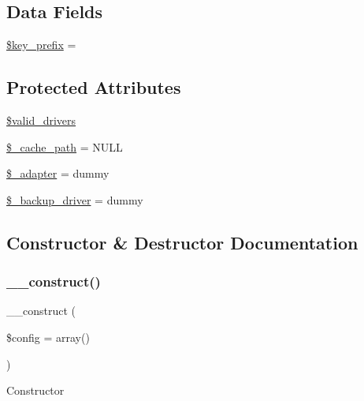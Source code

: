 \subsection*{Data Fields}
\begin{DoxyCompactItemize}
\item 
\mbox{\hyperlink{class_c_i___cache_ac5ae5bfe56bac385a2687d7503487f38}{\$key\+\_\+prefix}} = \textquotesingle{}\textquotesingle{}
\end{DoxyCompactItemize}
\subsection*{Protected Attributes}
\begin{DoxyCompactItemize}
\item 
\mbox{\hyperlink{class_c_i___cache_a32d963b3d49fd67f188c1a74d38be6df}{\$valid\+\_\+drivers}}
\item 
\mbox{\hyperlink{class_c_i___cache_ae9407d6ae1ddd132cca3c7f855f89dfe}{\$\+\_\+cache\+\_\+path}} = N\+U\+LL
\item 
\mbox{\hyperlink{class_c_i___cache_a465f293474a3bbb7341af052f7de13d7}{\$\+\_\+adapter}} = \textquotesingle{}dummy\textquotesingle{}
\item 
\mbox{\hyperlink{class_c_i___cache_a6e11e902e473d1345a4caa11236ac828}{\$\+\_\+backup\+\_\+driver}} = \textquotesingle{}dummy\textquotesingle{}
\end{DoxyCompactItemize}


\subsection{Constructor \& Destructor Documentation}
\mbox{\label{class_c_i___cache_af7f9493844d2d66e924e3c1df51ce616}} 
\subsubsection{\texorpdfstring{\+\_\+\+\_\+construct()}{\_\_construct()}}
{\footnotesize\ttfamily \+\_\+\+\_\+construct (\begin{DoxyParamCaption}\item[{}]{\$config = {\ttfamily array()} }\end{DoxyParamCaption})}

Constructor

